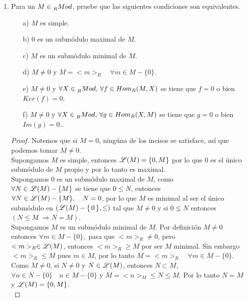 \documentclass{article}
\begin{document}
\begin{enumerate}[label=\textbf{Ej \arabic*.}]
		\item Para un $M\in \prescript{}{R}{Mod}$, pruebe que las siguientes condiciones son equivalentes.
		\begin{itemize}
			\item[a)]  $M$ es simple.
			\item[b)]  $0$ es un submódulo maximal de $M$.
			\item[c)]  $M$ es un submódulo minimal de $M$.
			\item[d)]  $M\neq 0$ y $M=<m>_R\quad \forall m\in M-\{0\}$.
			\item[e)]  $M\neq 0$ y $\forall X\in \prescript{}{R}{Mod}, \,\forall f\in Hom_R(M,X)$ se tiene que $f=0$ o bien 
			$Ker(f)=0$.
			\item[f)]  $M\neq 0$ y $\forall X\in \prescript{}{R}{Mod}, \,\forall g\in Hom_R(X,M)$ se tiene que $g=0$ o bien 
			$Im(g)=0$..
		\end{itemize}
		\begin{proof}
			Notemos que si $M=0$, ningúna de los incisos se satisface, así que podemos tomar $M\neq 0$.\\
			
			 Supongamos $M$ es simple, entonces $\mathscr{L}(M)=\{0,M\}$ por lo que $0$ es el único
			submódulo de $M$ propio y por lo tanto es maximal.\\
			
			 Supongamos $0$ es un submódulo maximal de $M$, como \\ $\forall N\in \mathscr{L}(M)-\{M\}$ se tiene 
			que $0\leq  N$, entonces \\ $\forall N\in\mathscr{L}(M)-\{M\},\quad N=0$, por lo que $M$ es minimal al ser el único submódulo en 
			$\left(\mathscr{L}(M)-\{\,0\,\},\leq \right)$ tal que $M\neq 0$ y si $0\lneq N$ entonces \quad $\left(N\leq M\,\,\Rightarrow N=M\right)$.\\
			
			Supongamos $M$ es un submódulo minimal de $M$. Por definición $M\neq 0$ entonces 
			$\forall m\in M-\{0\},$ pasa que $<m>_R\neq 0$, pero \\
			$<m>_R\in \mathscr{L}(M)$, entonces $<m>_R\geq M$ por ser $M$ minimal.
			Sin embargo $<m>_R\leq M$ pues $m\in M$, por lo tanto $M=<m>_R\quad \forall m\in M-\{0\}$.\\
			
			 Como $M\neq 0$, si $N\neq 0$ y $N\in \mathscr{L}(M)$, entonces $N\subset M$,
			$\forall n\in N-\{0\}\quad n\in M-\{0\}$ y $M=<n>_M\leq N\leq M$. Por lo tanto $N=M$ y $\mathscr{L}(M)=\{0,M\}$.\\
			

\end{proof}
\end{enumerate}
\end{document}
